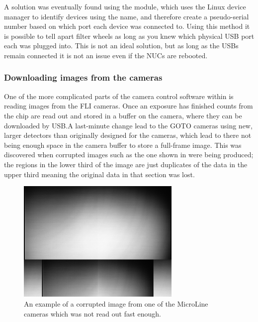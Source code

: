 \begin{colsection}
\begin{colsection}
A solution was eventually found using the   module, which uses the Linux  device manager to identify devices using the  name, and therefore create a pseudo-serial number based on which port each device was connected to. Using this method it is possible to tell apart filter wheels as long as you knew which physical USB port each was plugged into. This is not an ideal solution, but as long as the USBs remain connected it is not an issue even if the NUCs are rebooted.

\subsubsection{Downloading images from the cameras}

One of the more complicated parts of the camera control software within  is reading images from the FLI cameras. Once an exposure has finished counts from the chip are read out and stored in a buffer on the camera, where they can be downloaded by USB.\@ A last-minute change lead to the GOTO cameras using new, larger detectors than originally designed for the cameras, which lead to there not being enough space in the camera buffer to store a full-frame image. This was discovered when corrupted images such as the one shown in  were being produced; the regions in the lower third of the image are just duplicates of the data in the upper third meaning the original data in that section was lost.

\begin{figure}[t]
    \begin{center}
        \includegraphics[width=0.7\textwidth]{images/cam_readout.png}
    \end{center}
    \caption[A corrupted image which was not read out fast enough]{
        An example of a corrupted image from one of the MicroLine cameras which was not read out fast enough.
    }\label{fig:cam_readout}
\end{figure}


\end{colsection}
\end{colsection}
